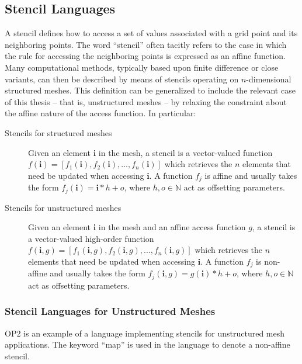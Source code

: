 \subsection{Stencil Languages}
\label{sec:bkg:stencil-lang}
A stencil defines how to access a set of values associated with a grid point and its neighboring points. The word ``stencil'' often tacitly refers to the case in which the rule for accessing the neighboring points is expressed as an affine function. Many computational methods, typically based upon finite difference or close variants, can then be described by means of stencils operating on $n$-dimensional structured meshes. This definition can be generalized to include the relevant case of this thesis -- that is, unstructured meshes -- by relaxing the constraint about the affine nature of the access function. In particular:

\begin{description}
\item[Stencils for structured meshes] Given an element $\boldsymbol{i}$ in the mesh, a stencil is a vector-valued function $f(\boldsymbol{i}) = [f_1(\boldsymbol{i}), f_2(\boldsymbol{i}), ..., f_n(\boldsymbol{i})]$ which retrieves the $n$ elements that need be updated when accessing $\boldsymbol{i}$. A function $f_j$ is affine and usually takes the form $f_j(\boldsymbol{i}) = \boldsymbol{i}*h + o$, where $h, o \in \mathbb{N}$ act as offsetting parameters.
\item[Stencils for unstructured meshes] Given an element $\boldsymbol{i}$ in the mesh and an affine access function $g$, a stencil is a vector-valued high-order function $f(\boldsymbol{i}, g) = [f_1(\boldsymbol{i}, g), f_2(\boldsymbol{i}, g), ..., f_n(\boldsymbol{i}, g)]$ which retrieves the $n$ elements that need be updated when accessing $\boldsymbol{i}$. A function $f_j$ is non-affine and usually takes the form $f_j(\boldsymbol{i}, g) = g(\boldsymbol{i})*h + o$, where $h, o \in \mathbb{N}$ act as offsetting parameters.
\end{description}

\subsubsection{Stencil Languages for Unstructured Meshes}
OP2 is an example of a language implementing stencils for unstructured mesh applications. The keyword ``map'' is used in the language to denote a non-affine stencil. 

